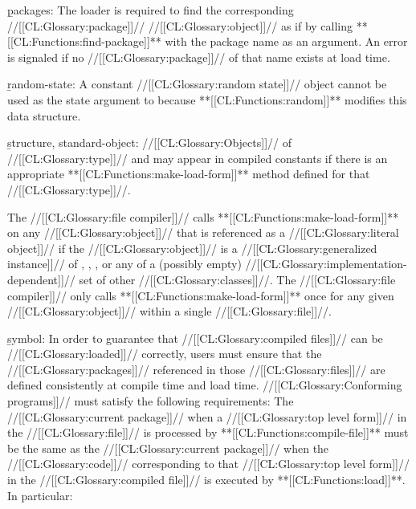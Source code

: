 \item{}\b{packages:} The loader is required to find the corresponding //[[CL:Glossary:package]]// //[[CL:Glossary:object]]// as if by calling  **[[CL:Functions:find-package]]** with the package name as an argument.   An error  is signaled if no  //[[CL:Glossary:package]]// of that name exists at load time.

 \item{}\b{random-state:} A constant //[[CL:Glossary:random state]]// object cannot be used as the state argument  to  because **[[CL:Functions:random]]** modifies this data structure.
  \item{}\b{structure, standard-object:} //[[CL:Glossary:Objects]]// of //[[CL:Glossary:type]]//  and  may appear in compiled constants if there is an appropriate **[[CL:Functions:make-load-form]]** method defined for that //[[CL:Glossary:type]]//.
   

 The //[[CL:Glossary:file compiler]]// calls **[[CL:Functions:make-load-form]]** on any //[[CL:Glossary:object]]// that is referenced as a //[[CL:Glossary:literal object]]// if the //[[CL:Glossary:object]]// is a //[[CL:Glossary:generalized instance]]// of , , , or any of a  (possibly empty) //[[CL:Glossary:implementation-dependent]]// set of other //[[CL:Glossary:classes]]//. The //[[CL:Glossary:file compiler]]// only calls **[[CL:Functions:make-load-form]]** once for any given //[[CL:Glossary:object]]// within a single //[[CL:Glossary:file]]//.

 \item{}\b{symbol:} In order to guarantee that //[[CL:Glossary:compiled files]]// can be //[[CL:Glossary:loaded]]//
  correctly, users must ensure that the //[[CL:Glossary:packages]]// referenced in those //[[CL:Glossary:files]]//
  are defined consistently at compile time and load time.  //[[CL:Glossary:Conforming programs]]//
  must satisfy the following requirements:
   \beginlist {} The //[[CL:Glossary:current package]]// when a //[[CL:Glossary:top level form]]// in the //[[CL:Glossary:file]]//
      is processed by **[[CL:Functions:compile-file]]** must be the same as the //[[CL:Glossary:current package]]//
      when the //[[CL:Glossary:code]]// corresponding to that //[[CL:Glossary:top level form]]// in the
      //[[CL:Glossary:compiled file]]// is executed by **[[CL:Functions:load]]**.  In particular:

